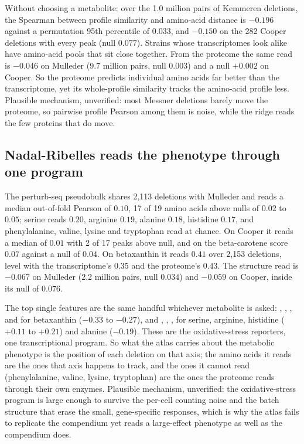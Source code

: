 Without choosing a metabolite: over the 1.0 million pairs of Kemmeren deletions, the
Spearman between profile similarity and amino-acid distance is $-0.196$ against a
permutation 95th percentile of $0.033$, and $-0.150$ on the 282 Cooper deletions with
every peak (null $0.077$). Strains whose transcriptomes look alike have amino-acid
pools that sit close together. From the proteome the same read is $-0.046$ on Mulleder
(9.7 million pairs, null $0.003$) and a null $+0.002$ on Cooper. So the proteome
predicts individual amino acids far better than the transcriptome, yet its whole-profile
similarity tracks the amino-acid profile less. Plausible mechanism, unverified: most
Messner deletions barely move the proteome, so pairwise profile Pearson among them is
noise, while the ridge reads the few proteins that do move.

\subsection{Nadal-Ribelles reads the phenotype through one program}
\label{sec:findings-nadal}

The perturb-seq pseudobulk shares 2{,}113 deletions with Mulleder and reads a median
out-of-fold Pearson of $0.10$, 17 of 19 amino acids above nulls of $0.02$ to $0.05$;
serine reads $0.20$, arginine $0.19$, alanine $0.18$, histidine $0.17$, and
phenylalanine, valine, lysine and tryptophan read at chance. On Cooper it reads a
median of $0.01$ with 2 of 17 peaks above null, and on the beta-carotene score $0.07$
against a null of $0.04$. On betaxanthin it reads $0.41$ over 2{,}153 deletions, level
with the transcriptome's $0.35$ and the proteome's $0.43$. The structure read is
$-0.067$ on Mulleder (2.2 million pairs, null $0.034$) and $-0.059$ on Cooper, inside
its null of $0.076$.

 The top single features are
the same handful whichever metabolite is asked: , , ,
 and  for betaxanthin ($-0.33$ to $-0.27$), and ,
, ,  for serine, arginine, histidine ($+0.11$ to
$+0.21$) and alanine ($-0.19$). These are the oxidative-stress reporters, one
transcriptional program. So what the atlas carries about the metabolic phenotype is the
position of each deletion on that axis; the amino acids it reads are the ones that axis
happens to track, and the ones it cannot read (phenylalanine, valine, lysine,
tryptophan) are the ones the proteome reads through their own enzymes. Plausible
mechanism, unverified: the oxidative-stress program is large enough to survive the
per-cell counting noise and the batch structure that erase the small, gene-specific
responses, which is why the atlas fails to replicate the compendium yet reads a
large-effect phenotype as well as the compendium does.

